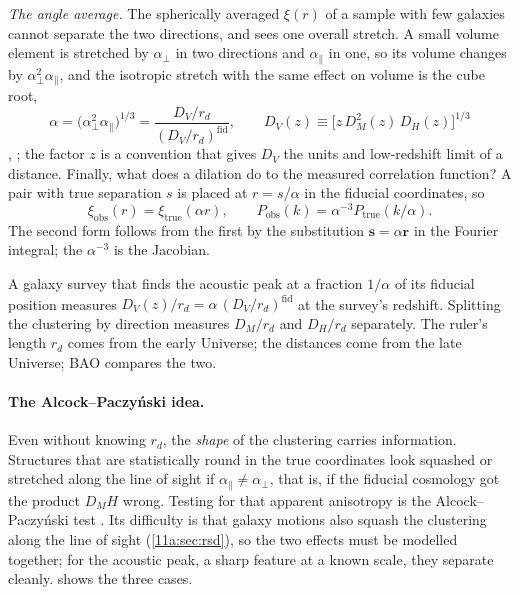 \emph{The angle average.} The spherically averaged $\xi(r)$ of a sample with few
galaxies cannot separate the two directions, and sees one overall stretch. A small
volume element is stretched by $\alpha_\perp$ in two directions and
$\alpha_\parallel$ in one, so its volume changes by $\alpha_\perp^2\alpha_\parallel$,
and the isotropic stretch with the same effect on volume is the cube root,
\begin{equation}
  \alpha=\bigl(\alpha_\perp^2\alpha_\parallel\bigr)^{1/3}
  =\frac{D_V/r_d}{(D_V/r_d)^{\mathrm{fid}}},\qquad
  D_V(z)\equiv\bigl[z\,D_M^2(z)\,D_H(z)\bigr]^{1/3}
  \label{11a:eq:dv}
\end{equation}
, ; the factor $z$
is a convention that gives $D_V$ the units and low-redshift limit of a distance.
Finally, what does a dilation do to the measured correlation function? A pair with
true separation $s$ is placed at $r=s/\alpha$ in the fiducial coordinates, so
\begin{equation}
  \xi_{\mathrm{obs}}(r)=\xi_{\mathrm{true}}(\alpha r),\qquad
  P_{\mathrm{obs}}(k)=\alpha^{-3}P_{\mathrm{true}}(k/\alpha).
  \label{11a:eq:dilation}
\end{equation}
The second form follows from the first by the substitution $\bm s=\alpha\bm r$ in
the Fourier integral; the $\alpha^{-3}$ is the Jacobian.

\begin{keyidea}
A galaxy survey that finds the acoustic peak at a fraction $1/\alpha$ of its
fiducial position measures $D_V(z)/r_d=\alpha\,(D_V/r_d)^{\mathrm{fid}}$ at the
survey's redshift. Splitting the clustering by direction measures $D_M/r_d$ and
$D_H/r_d$ separately. The ruler's length $r_d$ comes from the early Universe; the
distances come from the late Universe; BAO compares the two.
\end{keyidea}

\paragraph{The Alcock--Paczy\'nski idea.}
Even without knowing $r_d$, the \emph{shape} of the clustering carries
information. Structures that are statistically round in the true coordinates look
squashed or stretched along the line of sight if $\alpha_\parallel\ne\alpha_\perp$,
that is, if the fiducial cosmology got the product $D_MH$ wrong. Testing for that
apparent anisotropy is the Alcock--Paczy\'nski test .
Its difficulty is that galaxy motions also squash the clustering along the line
of sight (\cref{11a:sec:rsd}), so the two effects must be modelled together;
for the acoustic peak, a sharp feature at a known scale, they separate cleanly.
 shows the three cases.


